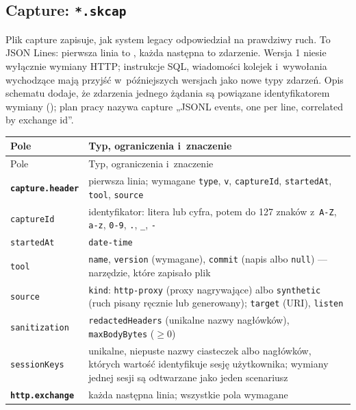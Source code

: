 \subsection{Capture: \texttt{*.skcap}}\label{sec:formaty-skcap}

Plik capture zapisuje, jak system legacy odpowiedział na prawdziwy ruch. To JSON Lines:
pierwsza linia to , każda następna to zdarzenie. Wersja 1 niesie
wyłącznie wymiany HTTP; instrukcje SQL, wiadomości kolejek i~wywołania wychodzące mają przyjść
w~późniejszych wersjach jako nowe typy zdarzeń. Opis schematu dodaje, że zdarzenia jednego
żądania są powiązane identyfikatorem wymiany (); plan pracy nazywa capture „JSONL
events, one per line, correlated by exchange id”.

{\small
\begin{xltabular}{\linewidth}{@{}>{\raggedright\arraybackslash}p{3.6cm} >{\raggedright\arraybackslash}X@{}}
\toprule
Pole & Typ, ograniczenia i~znaczenie \\
\midrule
\endfirsthead
\toprule
Pole & Typ, ograniczenia i~znaczenie \\
\midrule
\endhead
\bottomrule
\endlastfoot
\textbf{\texttt{capture.header}} & pierwsza linia; wymagane \texttt{type}, \texttt{v},
\texttt{captureId}, \texttt{startedAt}, \texttt{tool}, \texttt{source} \\
\texttt{captureId} & identyfikator: litera lub cyfra, potem do 127 znaków z~\texttt{A-Z},
\texttt{a-z}, \texttt{0-9}, \texttt{.}, \texttt{\_}, \texttt{-} \\
\texttt{startedAt} & \texttt{date-time} \\
\texttt{tool} & \texttt{name}, \texttt{version} (wymagane), \texttt{commit} (napis albo
\texttt{null}) --- narzędzie, które zapisało plik \\
\texttt{source} & \texttt{kind}: \texttt{http-proxy} (proxy nagrywające) albo \texttt{synthetic}
(ruch pisany ręcznie lub generowany); \texttt{target} (URI), \texttt{listen} \\
\texttt{sanitization} & \texttt{redactedHeaders} (unikalne nazwy nagłówków),
\texttt{maxBodyBytes} ($\geq 0$) \\
\texttt{sessionKeys} & unikalne, niepuste nazwy ciasteczek albo nagłówków, których wartość
identyfikuje sesję użytkownika; wymiany jednej sesji są odtwarzane jako jeden scenariusz \\
\midrule
\textbf{\texttt{http.exchange}} & każda następna linia; wszystkie pola wymagane \\

\end{xltabular}}
